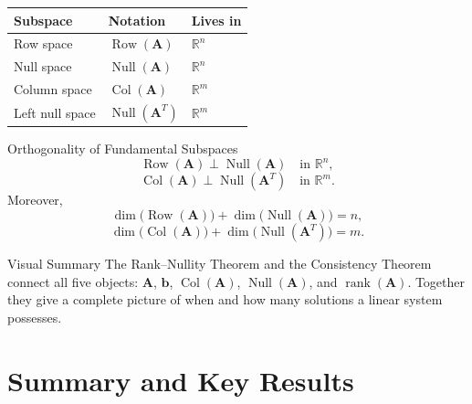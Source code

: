 \documentclass[12pt,a4paper]{article}
\newcommand{\R}{\mathbb{R}}
\newcommand{\vv}[1]{\mathbf{#1}}
\newcommand{\rank}{\operatorname{rank}}
\newcommand{\Null}{\operatorname{Null}}
\newcommand{\Col}{\operatorname{Col}}
\newcommand{\Row}{\operatorname{Row}}
\newcommand{\mat}[1]{\mathbf{#1}}
\begin{document}
	\begin{center}
		\begin{tabular}{@{}lll@{}}
			\toprule
			\textbf{Subspace} & \textbf{Notation} & \textbf{Lives in} \\
			\midrule
			Row space       & \(\Row(\mat{A})\)            & \(\R^n\) \\
			Null space      & \(\Null(\mat{A})\)           & \(\R^n\) \\
			Column space    & \(\Col(\mat{A})\)            & \(\R^m\) \\
			Left null space & \(\Null(\mat{A}^T)\)         & \(\R^m\) \\
			\bottomrule
		\end{tabular}
	\end{center}
	
	\begin{thmbox}{Orthogonality of Fundamental Subspaces}{}
		\[
		\Row(\mat{A}) \perp \Null(\mat{A}) \quad \text{in } \R^n,
		\]
		\[
		\Col(\mat{A}) \perp \Null(\mat{A}^T) \quad \text{in } \R^m.
		\]
		Moreover,
		\[
		\dim\bigl(\Row(\mat{A})\bigr) + \dim\bigl(\Null(\mat{A})\bigr) = n,
		\]
		\[
		\dim\bigl(\Col(\mat{A})\bigr) + \dim\bigl(\Null(\mat{A}^T)\bigr) = m.
		\]
	\end{thmbox}
	
	\begin{remarkbox}{Visual Summary}{}
		The Rank--Nullity Theorem and the Consistency Theorem connect all five objects:
		$\mat{A}$, $\vv{b}$, $\Col(\mat{A})$, $\Null(\mat{A})$, and $\rank(\mat{A})$.
		Together they give a complete picture of when and how many solutions a linear system
		possesses.
	\end{remarkbox}
	
	\section{Summary and Key Results}
	
\end{document}
